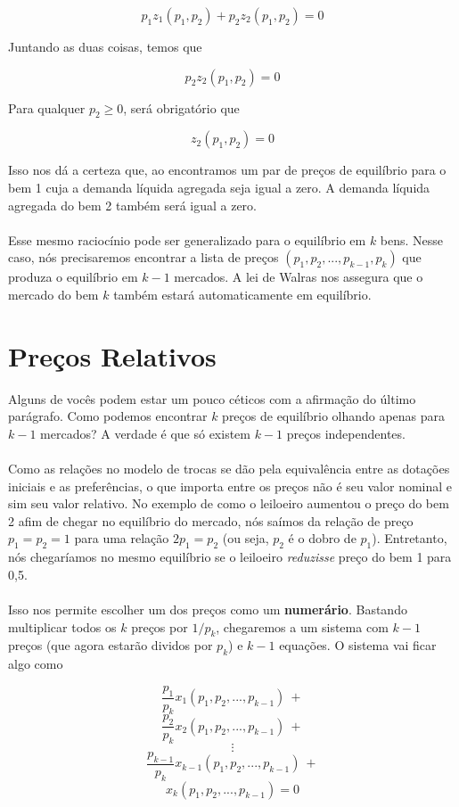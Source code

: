 \documentclass[a4paper,11pt,oneside]{book}
\theoremstyle{definition}
\theoremstyle{break}
\begin{document}
$$p_1 z_1(p_1,p_2) + p_2 z_2(p_1,p_2) = 0$$

Juntando as duas coisas, temos que

$$ p_2 z_2(p_1,p_2) = 0$$

Para qualquer $p_2 \geq 0$, será obrigatório que

$$z_2(p_1,p_2) = 0$$

Isso nos dá a certeza que, ao encontramos um par de preços de equilíbrio para o bem 1 cuja a demanda líquida agregada seja igual a zero. A demanda líquida agregada do bem 2 também será igual a zero.
\\
\\
Esse mesmo raciocínio pode ser generalizado para o equilíbrio em $k$ bens. Nesse caso, nós precisaremos encontrar a lista de preços $(p_1,p_2,...,p_{k-1},p_k)$ que produza o equilíbrio em $k - 1$ mercados. A lei de Walras nos assegura que o mercado do bem $k$ também estará automaticamente em equilíbrio.

\section{Preços Relativos}

Alguns de vocês podem estar um pouco céticos com a afirmação do último parágrafo. Como podemos encontrar $k$ preços de equilíbrio olhando apenas para $k - 1$ mercados? A verdade é que só existem $k - 1$ preços independentes. 
\\
\\
Como as relações no modelo de trocas se dão pela equivalência entre as dotações iniciais e as preferências, o que importa entre os preços não é seu valor nominal e sim seu valor relativo. No exemplo de como o leiloeiro aumentou o preço do bem 2 afim de chegar no equilíbrio do mercado, nós saímos da relação de preço $p_1 = p_2 = 1$ para uma relação $2p_1 = p_2$ (ou seja, $p_2$ é o dobro de $p_1$). Entretanto, nós chegaríamos no mesmo equilíbrio se o leiloeiro \textit{reduzisse} preço do bem 1 para 0,5.
\\
\\
Isso nos permite escolher um dos preços como um \textbf{numerário}. Bastando multiplicar todos os $k$ preços por $1/p_k$, chegaremos a um sistema com $k - 1$ preços (que agora estarão dividos por $p_k$) e $k - 1$ equações. O sistema vai ficar algo como

$$\frac{p_1}{p_k}x_1(p_1,p_2,...,p_{k-1}) \ + $$
$$\frac{p_2}{p_k}x_2(p_1,p_2,...,p_{k-1}) \ + $$ 
$$ \vdots $$
$$\frac{p_{k-1}}{p_k}x_{k - 1}(p_1,p_2,...,p_{k-1}) \ + $$
$$x_{k}(p_1,p_2,...,p_{k-1}) = 0$$
\end{document}
